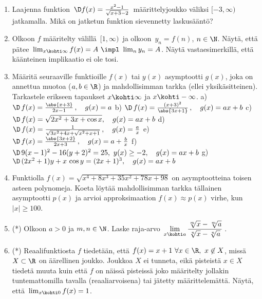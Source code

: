 \begin{enumerate}
\item
Laajenna funktion $\,\D f(x)=\frac{x^2-1}{\sqrt{x+3}-2}\,$
määrittelyjoukko väliksi $[-3,\infty)$ jatkamalla. Mikä on jatketun funktion sievennetty
laskusääntö?

\item
Olkoon $f$ määritelty välillä $\,[1,\infty)\,$ ja olkoon $\,y_n=f(n)$, $n\in\N$. Näytä, että
pätee $\,\lim_{x\kohti\infty} f(x)=A\ \impl\ \lim_ny_n=A$. Näytä vastaesimerkillä, että
käänteinen implikaatio ei ole tosi.

\item
Määritä seuraaville funktioille $f(x)$ tai $y(x)$ asymptootti $g(x)$, joka on annettua
muotoa ($a,b\in\R$) ja mahdollisimman tarkka (ellei yksikäsitteinen). Tarkastele erikseen
tapaukset $x\kohti\infty$ ja $x \kohti -\infty$. \vspace{2mm}\newline
a) $\D \,f(x)=\frac{\abs{x+3}}{2x-1}\,, \quad g(x)=a$ \newline
b) $\D \,f(x)=\frac{(x+3)^2}{\abs{3x+1}}\,, \quad g(x)=ax+b$ \vspace{1mm}\newline
c) $\D \,f(x)=\sqrt{2x^2+3x+\cos x}, \quad g(x)=ax+b$ \vspace{3mm}\newline
d) $\D \,f(x)=\frac{1}{\sqrt{3x^2+4x}+\sqrt{x^2+x+1}}\,, \quad g(x)=\frac{a}{x}$ 
                                                         \vspace{1mm}\newline
e) $\D \,f(x)=\frac{\abs{3x+2}}{2x+3}\,, \quad g(x)=a+\frac{b}{x}$ \vspace{2mm}\newline
f) $\D \,9(x-1)^2-16(y+2)^2=25,\ y(x) \ge -2, \quad g(x)=ax+b$ \vspace{3mm}\newline
g) $\D \,(2x^2+1)y+x\,\cos y=(2x+1)^3, \quad g(x)=ax+b$

\item
Funktiolla $f(x)=\sqrt{x^4+8x^3+35x^2+78x+98}$ on asymptootteina toisen asteen polynomeja. 
Koeta löytää mahdollisimman tarkka tällainen asymptootti $p(x)$ ja arvioi approksimaation 
$f(x)\approx p(x)$ virhe, kun $|x|\ge 100$.

\item (*)
Olkoon $a>0$ ja $m,n\in\N$. Laske raja-arvo
$\displaystyle{\,\lim_{x \kohti a} \frac{\sqrt[m]{x}-\sqrt[m]{a}}{\sqrt[n]{x}-\sqrt[n]{a}}\,}$.

\item (*) Reaalifunktiosta $f$ tiedetään, että $f(x)=x+1\ \forall x\in\R,\ x \not\in X$, missä
$X\subset\R$ on äärellinen joukko. Joukkoa $X$ ei tunneta, eikä pisteistä $x \in X$ tiedetä
muuta kuin että $f$ on näissä pisteissä joko määritelty jollakin tuntemattomilla tavalla
(reaaliarvoisena) tai jätetty määrittelemättä. Näytä, että $\,\lim_{x \kohti 0} f(x)=1$.

\end{enumerate}